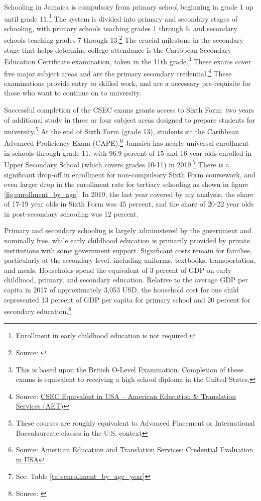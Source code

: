 \documentclass[12pt]{article}
\renewcommand\footnotesize{\fontsize{11}{13}\selectfont}
\begin{document}
	Schooling in Jamaica is compulsory from primary school beginning in grade 1 up until grade 11.\footnote{\footnotesize  Enrollment in early childhood education is not required.} The system is divided into primary and secondary stages of schooling, with primary schools teaching grades 1 through 6, and secondary schools teaching grades 7 through 13.\footnote{\footnotesize Source: \parencite{ the_world_bank_public_2021}} The crucial milestone in the secondary stage that helps determine college attendance is the Caribbean Secondary Education Certificate examination, taken in the 11th grade.\footnote{\footnotesize This is based upon the British O-Level Examination. Completion of these exams is equivalent to receiving a high school diploma in the United States.} These exams cover five major subject areas and are the primary secondary credential.\footnote{\footnotesize Source: \href{https://americantranslationservice.com/blog/foreign-credential-evaluation-in-usa-csec.php}{CSEC Equivalent in USA -- American Education \& Translation Services (AET)}} These examinations provide entry to skilled work, and are a necessary pre-requisite for those who want to continue on to university. 
	
	Successful completion of the CSEC exams grants access to Sixth Form: two years of additional study in three or four subject areas designed to prepare students for university.\footnote{\footnotesize These courses are roughly equivalent to Advanced Placement or International Baccalaureate classes in the U.S. context}  At the end of Sixth Form (grade 13), students sit the Caribbean Advanced Proficiency Exam (CAPE).\footnote{\footnotesize Source: \href{https://americantranslationservice.com/blog/foreign-credential-evaluation-in-usa-csec.php}{American Education and Translation Services: Credential Evaluation in USA}} Jamaica has nearly universal enrollment in schools through grade 11, with $96.9$ percent of 15 and 16 year olds enrolled in Upper Secondary School (which covers grades 10-11) in 2019.\footnote{\footnotesize See: Table \ref{tab:enrollment_by_age_year}} There is a significant drop-off in enrollment for non-compulsory Sixth Form coursework, and even larger drop in the enrollment rate for tertiary schooling as shown in figure \ref{fig:enrollment_by_age}. In 2019, the last year covered by my analysis, the share of 17-19 year olds in Sixth Form was 45 percent, and the share of 20-22 year olds in post-secondary schooling was 12 percent. 
	
	Primary and secondary schooling is largely administered by the government and nominally free, while early childhood education is primarily provided by private institutions with some government support. Significant costs remain for families, particularly at the secondary level, including uniforms, textbooks, transportation, and meals. Households spend the equivalent of 3 percent of GDP on early childhood, primary, and secondary education. Relative to the average GDP per capita in 2017 of approximately 3,053 USD, the household cost for one child represented 13 percent of GDP per capita for primary school and 20 percent for secondary education.\footnote{\footnotesize Source: \parencite{the_world_bank_public_2021}} 
	
\end{document}
